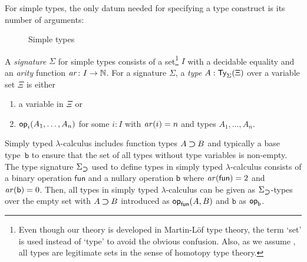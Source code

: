 For simple types, the only datum needed for specifying a type construct is its number of arguments:
\begin{definition} \label{def:simple-signature}
  \begin{figure}
      \centering
      \small
      \caption{Simple types}
      \label{fig:simple-type}
  \end{figure}
  A \emph{signature} $\Sigma$ for simple types consists of a set\footnote{%
    Even though our theory is developed in Martin-L\"of type theory, the term `set' is used instead of `type' to avoid the obvious confusion. 
    Also, as we assume \AxiomK, all types are legitimate sets in the sense of homotopy type theory.
  }
  $I$ with a decidable equality and an \emph{arity} function $\mathit{ar}\colon I \to \mathbb{N}$.
  For a signature $\Sigma$, a \emph{type} $A : \mathsf{Ty}_{\Sigma}(\Xi)$ over a variable set $\Xi$ is either
  \begin{enumerate}
    \item a variable in $\Xi$ or
    \item $\mathsf{op}_{i}(A_1, \ldots, A_n)$ for some $i:I$ with $\mathit{ar}(i) = n$ and types $A_1,\ldots, A_n$.
  \end{enumerate}
\end{definition}

\begin{example} \label{ex:type-signature-for-function-type}
  Simply typed $\lambda$-calculus includes function types $A \mathbin{\bm{\supset}} B$ and typically a base type~$\mathtt{b}$ to ensure that the set of all types without type variables is non-empty.
  The type signature $\Sigma_{\mathbin{\bm{\supset}}}$ used to define types in simply typed $\lambda$-calculus consists of a binary operation $\mathsf{fun}$ and a nullary operation $\mathsf{b}$ where $\mathit{ar}(\mathsf{fun}) = 2$ and $\mathit{ar}(\mathsf{b}) = 0$.
  Then, all types in simply typed $\lambda$-calculus can be given as $\Sigma_{\mathbin{\bm{\supset}}}$-types over the empty set with $A \mathbin{\bm{\supset}} B$ introduced as $\mathsf{op}_{\mathsf{fun}}(A, B)$ and $\mathtt{b}$ as $\mathsf{op}_{\mathsf{b}}$. 
\end{example}


